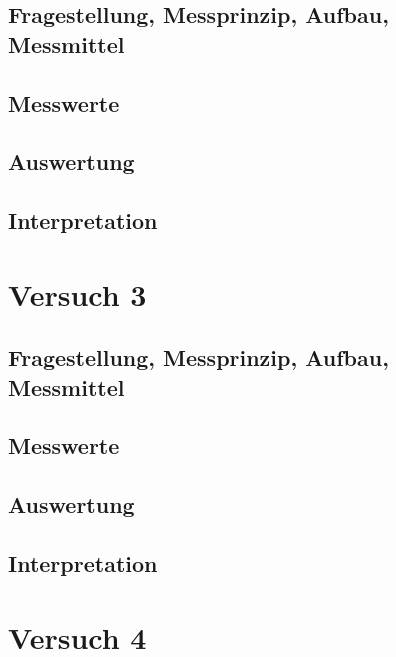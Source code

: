 \documentclass[12pt,oneside,a4paper]{report}
\begin{document}
\section{Fragestellung, Messprinzip, Aufbau, Messmittel}
\label{chap:VERSUCH_2_FRAGESTELLUNG}

\section{Messwerte}
\label{chap:VERSUCH_2_MESSWERTE}

\section{Auswertung}
\label{chap:VERSUCH_2_AUSWERTUNG}

\section{Interpretation}
\label{chap:VERSUCH_2_INTERPRETATION}

%
%
\chapter{Versuch 3}
\label{chap:VERSUCH_3}

\section{Fragestellung, Messprinzip, Aufbau, Messmittel}
\label{chap:VERSUCH_3_FRAGESTELLUNG}

\section{Messwerte}
\label{chap:VERSUCH_3_MESSWERTE}

\section{Auswertung}
\label{chap:VERSUCH_3_AUSWERTUNG}

\section{Interpretation}
\label{chap:VERSUCH_3_INTERPRETATION}

%
%
\chapter{Versuch 4}
\label{chap:VERSUCH_4}
\end{document}
